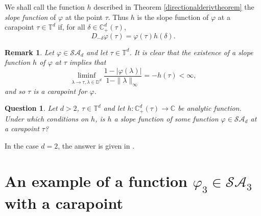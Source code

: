 \documentclass[11pt, reqno]{amsart}
\newtheorem{question}[theorem]{Question}
\newtheorem{remark}[theorem]{Remark}
\newcommand\1{\boldsymbol {1}}
\newcommand\be{\begin{equation}}
\newcommand\ee{\end{equation}}
\newcommand\lam{\lambda}
\newcommand{\T}{\mathbb{T}}
\newcommand{\D}{\mathbb{D}}
\newcommand{\C}{\mathbb{C}}
\newcommand{\ph}{\varphi}
\numberwithin{equation}{section}
\begin{document}
We shall call the function $h$ described in Theorem \ref{directionalderivtheorem}
 the {\em slope function} of $\ph$ at the point $\tau$.  Thus $h$ is the slope function of $\ph$ at a carapoint $\tau\in\T^d$  
if, for all $ \delta\in\mathbb{C}_{+}^{d}(\tau)$,
            \begin{equation}\label{directionalderivativeD-2}
        D_{- \delta}\varphi(\tau) = \varphi(\tau)h( \delta).
\end{equation}

\begin{remark} Let  $\varphi\in\mathcal{SA}_{d}$ and let $\tau\in\mathbb{T}^{d}$. It is clear that the existence of a slope function $h$  of $\ph$ at $\tau$ implies that 
\be \label{Carapoint-2}
\liminf_{\lam \to \tau, \lam \in \D^d} \frac{1-|\ph(\lam)|}{1-\|\lam\|_\infty} =-h(\tau) < \infty,
\ee
and so $\tau$ is a carapoint for $\varphi$.
\end{remark}

\begin{question} Let  $d>2$, $\tau\in\mathbb{T}^{d}$ and let $h:\C_+^d(\tau) \to \C$ be  analytic function. Under which conditions on $h$, is $h$ a slope function of some function  $\varphi\in\mathcal{SA}_{d}$ at  a carapoint $\tau$?
\end{question}
 In the case $d=2$, the answer is given in \cite[Theorem 6.2]{ATY2}.


\section{An example of a function $\varphi_3\in\mathcal{SA}_{3}$ with a carapoint}\label{example-in-D3}
\end{document}
